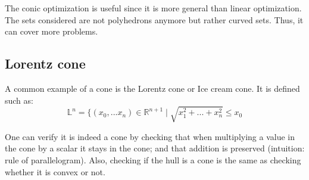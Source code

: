 The conic optimization is useful since it is more general than linear optimization. The sets considered are not polyhedrons anymore but rather curved sets. Thus, it can cover more problems.

\subsection{Lorentz cone}
A common example of a cone is the Lorentz cone or Ice cream cone. It is defined such as: 
\[
\mathbb{L}^n = \{(x_0,...x_n) \in \mathbb{R}^{n+1} \mid \sqrt{x_1^2+...+x_n^2} \le x_0 
\]

One can verify it is indeed a cone by checking that when multiplying a value in the cone by a scalar it stays in the cone; and that addition is preserved (intuition: rule of parallelogram). Also, checking if the hull is a cone is the same as checking whether it is convex or not.

